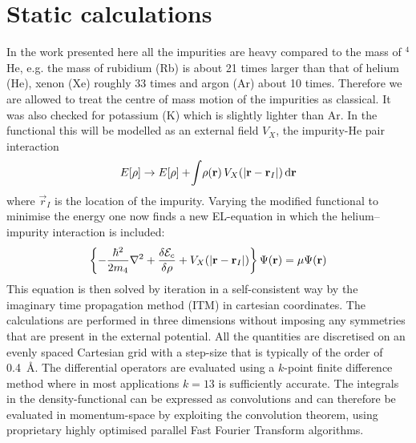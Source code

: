 	\section{Static calculations}
		In the work presented here all the impurities are heavy compared to the mass of $^4$He, e.g. the mass of rubidium (Rb) is about 21 times larger than that of helium (He), xenon (Xe) roughly 33 times and argon (Ar) about 10 times. Therefore we are allowed to treat the centre of mass motion of the impurities as classical. It was also checked for potassium (K) which is slightly lighter than Ar\citep{Martinez2017}. In the functional this will be modelled as an external field $V_X$, the impurity-He pair interaction
		\begin{align}
			E[\rho] \rightarrow E[\rho] + \!\int\!\rho(\bm{\mathrm{r}})\,V_X\qty(\abs{\bm{\mathrm{r}}-\bm{\mathrm{r}}_I})\,\mathrm{d}{\bm{\mathrm{r}}} \label{eq:el-static-hi}
		\end{align}
		where ${\vec r}_I$ is the location of the impurity. Varying the modified functional to minimise the energy one now finds a new EL-equation in which the helium--impurity interaction is included:
		\begin{align}
			\left\{-\frac{\hbar^2}{2m_4} \laplacian + \fdv{\mathcal{E}_c}{\rho} + V_X(|{\mathbf r} - {\mathbf r_I}|)\right\}\Psi({\mathbf r}) = \mu \Psi({\mathbf r}) \label{eq:el-static-hi}
		\end{align}
		This equation is then solved by iteration in a self-consistent way by the imaginary time propagation method\citep{Lehtovaara2007} (ITM) in cartesian coordinates. The calculations are performed in three dimensions without imposing any symmetries that are present in the external potential. All the quantities are discretised on an evenly spaced Cartesian grid with a step-size that is typically of the order of 0.4~\AA. The differential operators are evaluated using a $k$-point finite difference method where in most applications $k=13$ is sufficiently accurate. The integrals in the density-functional can be expressed as convolutions and can therefore be evaluated in momentum-space by exploiting the convolution theorem, using proprietary highly optimised parallel Fast Fourier Transform algorithms. 
			

